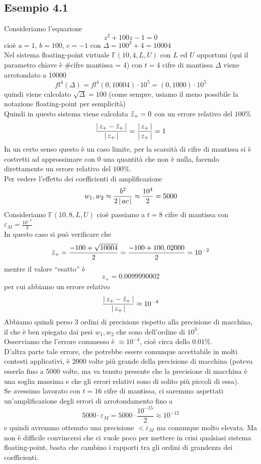 \subsection{Esempio 4.1}
Consideriamo l'equazione \[z^2 + 100z -1 = 0\]
cioè $a = 1$, $b= 100$, $c =-1$ con $\Delta = 100^2+4= 10004$\\
Nel sistema floating-point virtuale $\mathbb{F}(10, 4, L, U)$ con $L$ ed $U$ opportuni (qui il parametro chiave è $\#$cifre mantissa = 4) con $t=4$ cifre di mantissa $\Delta$ viene arrotondato a 10000
\[fl^4(\Delta) = fl^4(0,10004)\cdot 10^5=(0,1000)\cdot 10^5\]
quindi viene calcolato $\sqrt{\Delta} = 100$ (come sempre, usiamo il meno possibile la notazione floating-point per semplicità)\\
Quindi in questo sistema viene calcolata $\Tilde{z}_+ = 0$ con un errore relativo del $100\%$
\[\frac{\lvert\,z_+ - \Tilde{z}_+\,\rvert}{\lvert\,z_+\,\rvert} = \frac{\lvert\,z_+\,\rvert}{\lvert\,z_+\,\rvert} = 1\]
In un certo senso questo è un caso limite, per la scarsità di cifre di mantissa si è costretti ad approssimare con 0 una quantità che non è nulla, facendo direttamente un errore relativo del $100\%$.\\
Per vedere l'effetto dei coefficienti di amplificazione
\[w_1,w_2 \approx \frac{b^2}{2\,\lvert\,ac\,\rvert} \approx \frac{10^4}{2} = 5000\]
Consideriamo $\mathbb{F}(10,8,L,U)$ cioè passiamo a $t=8$ cifre di mantissa con $\varepsilon_M = \frac{10^{-7}}{2}$\\ 
In questo caso si può verificare che
\[ \Tilde{z}_+ = \frac{-100 + \sqrt{10004}}{2} = \frac{-100 + 100,02000}{2} = 10^{-2} \]
mentre il valore “esatto” è \[z_+= 0.0099990002\] per cui abbiamo un errore relativo
\[\frac{\lvert\,z_+ - \Tilde{z}_+\,\rvert}{\lvert\,z_+\,\rvert} \approx 10^{-4}\]
Abbiamo quindi perso 3 ordini di precisione rispetto alla precisione di macchina, il che è ben spiegato dai pesi $w_1, w_2$ che sono dell'ordine di $10^3$.\\ Osserviamo che l'errore commesso è $\approx 10^{-4}$, cioè circa dello $0.01\%$.\\ 
D'altra parte tale errore, che potrebbe essere comunque accettabile in molti contesti applicativi, è 2000 volte più grande della precisione di macchina (poteva esserlo fino a 5000 volte, ma va tenuto presente che la precisione di macchina è una soglia massima e che gli errori relativi sono di solito più piccoli di essa).\\
Se avessimo lavorato con $t=16$ cifre di mantissa, ci saremmo aspettati un'amplificazione degli errori di arrotondamento fino a
\[5000 \cdot\varepsilon_M = 5000 \cdot \frac{10^{-15}}{2} \approx 10^{-12}\]
e quindi avremmo ottenuto una precisione $< \varepsilon_M$ ma comunque molto elevata. Ma non è difficile convincersi che ci vuole poco per mettere in crisi qualsiasi sistema floating-point, basta che cambino i rapporti tra gli ordini di grandezza dei coefficienti.

